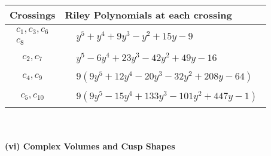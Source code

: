 \documentclass[1p]{elsarticle_modified}
\theoremstyle{definition}
\begin{document}
\begin{tabular}{m{50pt}|m{274pt}}
Crossings & \hspace{64pt}Riley Polynomials at each crossing \\
\hline $$\begin{aligned}c_{1},c_{3},c_{6}\\c_{8}\end{aligned}$$&$\begin{aligned}
&y^5+y^4+9 y^3- y^2+15 y-9
\end{aligned}$\\
\hline $$\begin{aligned}c_{2},c_{7}\end{aligned}$$&$\begin{aligned}
&y^5-6 y^4+23 y^3-42 y^2+49 y-16
\end{aligned}$\\
\hline $$\begin{aligned}c_{4},c_{9}\end{aligned}$$&$\begin{aligned}
&9(9 y^5+12 y^4-20 y^3-32 y^2+208 y-64)
\end{aligned}$\\
\hline $$\begin{aligned}c_{5},c_{10}\end{aligned}$$&$\begin{aligned}
&9(9 y^5-15 y^4+133 y^3-101 y^2+447 y-1)
\end{aligned}$\\
\hline
\end{tabular}\\~\\
\newpage\flushleft \textbf{(vi) Complex Volumes and Cusp Shapes}
\end{document}
